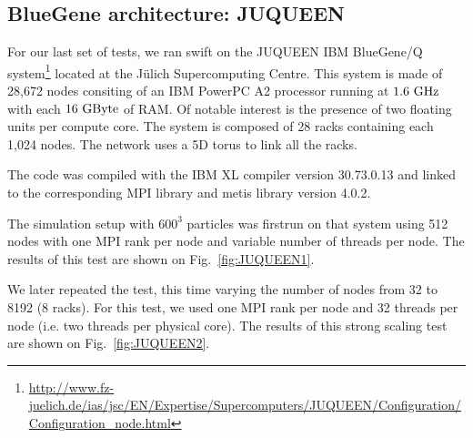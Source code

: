 \documentclass{sig-alternate-05-2015}
\newcommand{\swift}{{\sc swift}\xspace}
\begin{document}
\subsection{BlueGene architecture: JUQUEEN}

For our last set of tests, we ran \swift on the JUQUEEN IBM BlueGene/Q
system\footnote{\url{http://www.fz-juelich.de/ias/jsc/EN/Expertise/Supercomputers/JUQUEEN/Configuration/Configuration_node.html}}
located at the J\"ulich Supercomputing Centre. This system is made of 28,672
nodes consiting of an IBM PowerPC A2 processor running at $1.6~\rm{GHz}$ with
each $16~\rm{GByte}$ of RAM. Of notable interest is the presence of two floating
units per compute core. The system is composed of 28 racks containing each 1,024
nodes. The network uses a 5D torus to link all the racks.

The code was compiled with the IBM XL compiler version \textsc{30.73.0.13} and
linked to the corresponding MPI library and metis library
version \textsc{4.0.2}.

The simulation setup with $600^3$ particles was firstrun on that system using
512 nodes with one MPI rank per node and variable number of threads per
node. The results of this test are shown on Fig.~\ref{fig:JUQUEEN1}.

We later repeated the test, this time varying the number of nodes from 32 to
8192 (8 racks).  For this test, we used one MPI rank per node and 32 threads per
node (i.e. two threads per physical core). The results of this strong scaling
test are shown on Fig.~\ref{fig:JUQUEEN2}.
\end{document}
